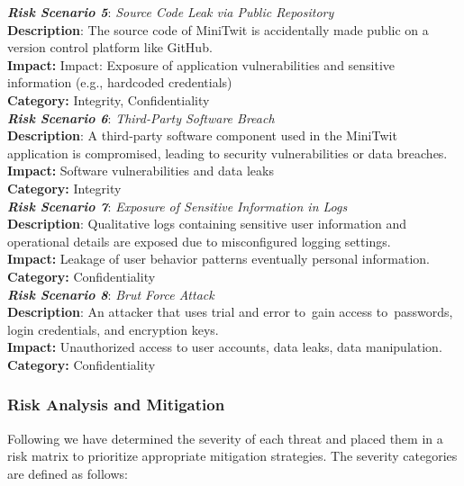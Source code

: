 \documentclass{article}
\begin{document}
\begin{multicols}{2}
\textit{\textbf{Risk Scenario 5}}: \textit{Source Code Leak via Public Repository} \\
\textbf{Description}: The source code of MiniTwit is accidentally made public on a version control platform like GitHub.\\
\textbf{Impact:} Impact: Exposure of application vulnerabilities and sensitive information (e.g., hardcoded credentials)\\
\textbf{Category:}  Integrity, Confidentiality \\

\textit{\textbf{Risk Scenario 6}}: \textit{Third-Party Software Breach} \\
\textbf{Description}: A third-party software component used in the MiniTwit application is compromised, leading to security vulnerabilities or data breaches.\\
\textbf{Impact:} Software vulnerabilities and data leaks\\
\textbf{Category:}  Integrity \\

\textit{\textbf{Risk Scenario 7}}: \textit{Exposure of Sensitive Information in Logs} \\
\textbf{Description}: Qualitative logs containing sensitive user information and operational details are exposed due to misconfigured logging settings.\\
\textbf{Impact:} Leakage of user behavior patterns eventually personal information.\\
\textbf{Category:}  Confidentiality \\

\textit{\textbf{Risk Scenario 8}}: \textit{Brut Force Attack} \\
\textbf{Description}:  An attacker that uses trial and error to gain access to passwords, login credentials, and encryption keys.\\
\textbf{Impact:} Unauthorized access to user accounts, data leaks, data manipulation.\\
\textbf{Category:} Confidentiality  \\

\end{multicols}


\subsubsection{Risk Analysis and Mitigation}

Following we have determined the severity of each threat and placed them in a risk matrix to prioritize appropriate mitigation strategies. The severity categories are defined as follows:
\end{document}
